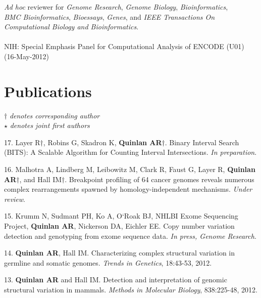 \documentclass[margin,line]{cv}
\begin{document}
\begin{resume}
    \textit{Ad hoc} reviewer for \textit{Genome Research}, \textit{Genome Biology}, \textit{Bioinformatics}, \\\vspace{1mm}%
    \textit{BMC Bioinformatics}, \textit{Bioessays}, \textit{Genes}, and
    \emph{IEEE Transactions On Computational Biology and Bioinformatics}.                                      \\\vspace{1mm}%
    \\
    NIH: Special Emphasis Panel for Computational Analysis of ENCODE (U01) (16-May-2012)                                   %
    
    \section{\mysidestyle Publications}
    $\dagger$\textit{ denotes corresponding author}\\
    $\star$\textit{ denotes joint first authors}

    \begin{list}{*}{}
    \item[17.] Layer R$\dagger$, Robins G, Skadron K, \textbf{Quinlan AR}$\dagger$. 
    Binary Interval Search (BITS): A Scalable Algorithm for Counting Interval Intersections. 
    \emph{In preparation}.

    \item[16.] Malhotra A, Lindberg M, Leibowitz M, Clark R, Faust G, Layer R, \textbf{Quinlan AR}$\dagger$, and Hall IM$\dagger$.
    Breakpoint profiling of 64 cancer genomes reveals numerous complex rearrangements spawned by homology-independent mechanisms. 
    \emph{Under review}.
	
    \item[15.] Krumm N, Sudmant PH, Ko A, O`Roak BJ, NHLBI Exome Sequencing Project, 
    \textbf{Quinlan AR}, Nickerson DA, Eichler EE. 
    Copy number variation detection and genotyping from exome sequence data. \emph{In press, Genome Research}.

    \item[14.] \textbf{Quinlan AR}, Hall IM. 
    Characterizing complex structural variation in germline and somatic genomes. 
    \textit{Trends in Genetics}, 18:43-53, 2012.

    \item[13.] \textbf{Quinlan AR} and Hall IM. 
    Detection and interpretation of genomic structural variation in mammals. \emph{Methods in Molecular Biology}, 838:225-48, 2012.
   

\end{list}
\end{resume}
\end{document}
